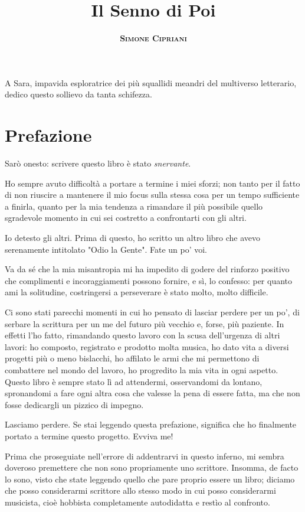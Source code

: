 \documentclass[12pt]{book}
\title{
	\Huge \textbf{Il Senno di Poi}
}
\author{
	\textsc{\textbf{Simone Cipriani}}
}
\newenvironment{dedication} {
	\cleardoublepage\thispagestyle{empty}
	\vspace*{\stretch{1}}
	\hfill\begin{minipage}[t]{0.66\textwidth}
	\raggedright}
{
	\end{minipage}
	\vspace*{\stretch{3}}
	\clearpage
}
\begin{document}
\setlength{\parskip}{0.25em}
\setlength{\parindent}{0.5em}

\frontmatter
\maketitle
\begin{dedication}
	A Sara, impavida esploratrice dei più squallidi meandri del multiverso letterario, dedico questo sollievo da tanta schifezza.
\end{dedication}

\mainmatter\chapter*{Prefazione}

Sarò onesto: scrivere questo libro è stato \emph{snervante}.

Ho sempre avuto difficoltà a portare a termine i miei sforzi; non tanto per il fatto di non riuscire a mantenere il mio focus sulla stessa cosa per un tempo sufficiente a finirla, quanto per la mia tendenza a rimandare il più possibile quello sgradevole momento in cui sei costretto a confrontarti con gli altri. 

Io detesto gli altri. Prima di questo, ho scritto un altro libro che avevo serenamente intitolato "Odio la Gente". Fate un po' voi.

Va da sé che la mia misantropia mi ha impedito di godere del rinforzo positivo che complimenti e incoraggiamenti possono fornire, e sì, lo confesso: per quanto ami la solitudine, costringersi a perseverare è stato molto, molto difficile. 

Ci sono stati parecchi momenti in cui ho pensato di lasciar perdere per un po', di serbare la scrittura per un me del futuro più vecchio e, forse, più paziente. In effetti l'ho fatto, rimandando questo lavoro con la scusa dell'urgenza di altri lavori: ho composto, registrato e prodotto molta musica, ho dato vita a diversi progetti più o meno bislacchi, ho affilato le armi che mi permettono di combattere nel mondo del lavoro, ho progredito la mia vita in ogni aspetto. Questo libro è sempre stato lì ad attendermi, osservandomi da lontano, spronandomi a fare ogni altra cosa che valesse la pena di essere fatta, ma che non fosse dedicargli un pizzico di impegno.

Lasciamo perdere. Se stai leggendo questa prefazione, significa che ho finalmente portato a termine questo progetto. Evviva me!

Prima che proseguiate nell'errore di addentrarvi in questo inferno, mi sembra doveroso premettere che non sono propriamente uno scrittore. Insomma, de facto lo sono, visto che state leggendo quello che pare proprio essere un libro; diciamo che posso considerarmi scrittore allo stesso modo in cui posso considerarmi musicista, cioè hobbista completamente autodidatta e restìo al confronto. 
\end{document}
